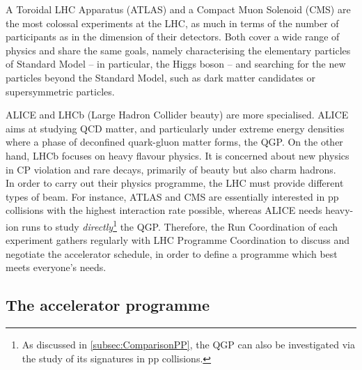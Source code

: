 A Toroidal LHC Apparatus (ATLAS) and a Compact Muon Solenoid (CMS) are the most colossal experiments at the LHC, as much in terms of the number of participants as in the dimension of their detectors. Both cover a wide range of physics and share the same goals, namely characterising the elementary particles of Standard Model -- in particular, the Higgs boson -- and searching for the new particles beyond the Standard Model, such as dark matter candidates or supersymmetric particles. 

ALICE and LHCb (Large Hadron Collider beauty) are more specialised. ALICE aims at studying QCD matter, and particularly under extreme energy densities where a phase of deconfined quark-gluon matter forms, the QGP. On the other hand, LHCb focuses on heavy flavour physics. It is concerned about new physics in CP violation and rare decays, primarily of beauty but also charm hadrons.\\

In order to carry out their physics programme, the LHC must provide different types of beam. For instance, ATLAS and CMS are essentially interested in pp collisions with the highest interaction rate possible, whereas ALICE needs heavy-ion runs to study \textit{directly}\footnote{As discussed in \Sec\ref{subsec:ComparisonPP}, the QGP can also be investigated via the study of its signatures in pp collisions.} the QGP. Therefore, the Run Coordination of each experiment gathers regularly with LHC Programme Coordination to discuss and negotiate the accelerator schedule, in order to define a programme which best meets everyone's needs.

\subsection{The accelerator programme}
\label{subsec:acceleratorprogramme}

